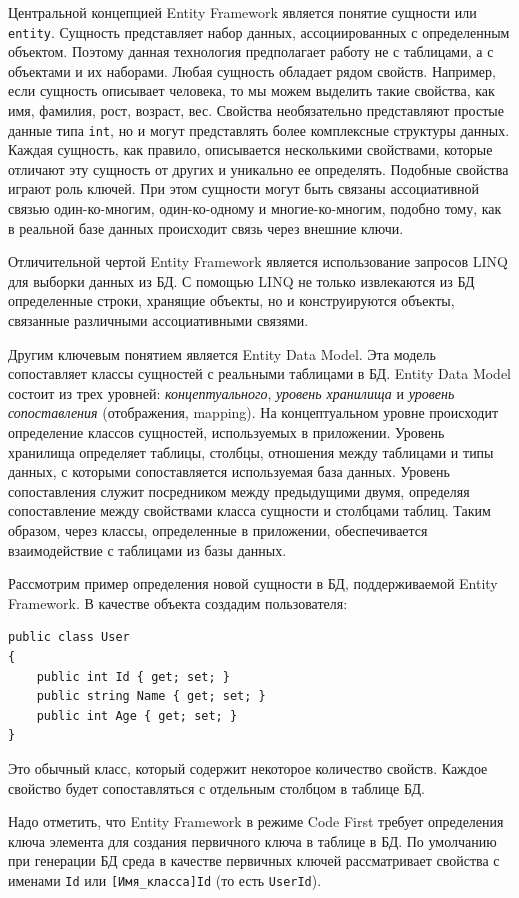 \documentclass[a4paper,14pt,openany,final]{extreport} %
\begin{document}
Центральной концепцией Entity Framework является понятие сущности или \verb|entity|. Сущность представляет набор данных, ассоциированных с определенным объектом. Поэтому данная технология предполагает работу не с таблицами, а с объектами и их наборами. Любая сущность обладает рядом свойств. Например, если сущность описывает человека, то мы можем выделить такие свойства, как имя, фамилия, рост, возраст, вес. Свойства необязательно представляют простые данные типа \verb|int|, но и могут представлять более комплексные структуры данных. Каждая сущность, как правило, описывается несколькими свойствами, которые отличают эту сущность от других и уникально ее определять. Подобные свойства играют роль ключей. При этом сущности могут быть связаны ассоциативной связью один-ко-многим, один-ко-одному и многие-ко-многим, подобно тому, как в реальной базе данных происходит связь через внешние ключи.

Отличительной чертой Entity Framework является использование запросов LINQ для выборки данных из БД. С помощью LINQ не только извлекаются из БД определенные строки, хранящие объекты, но и конструируются объекты, связанные различными ассоциативными связями.

Другим ключевым понятием является Entity Data Model. Эта модель сопоставляет классы сущностей с реальными таблицами в БД.
Entity Data Model состоит из трех уровней: \emph{концептуального},\emph{ уровень хранилища} и\emph{ уровень сопоставления} (отображения, mapping). На концептуальном уровне происходит определение классов сущностей, используемых в приложении. Уровень хранилища определяет таблицы, столбцы, отношения между таблицами и типы данных, с которыми сопоставляется используемая база данных. Уровень сопоставления служит посредником между предыдущими двумя, определяя сопоставление между свойствами класса сущности и столбцами таблиц. Таким образом, через классы, определенные в приложении, обеспечивается взаимодействие с таблицами из базы данных.

Рассмотрим пример определения новой сущности в БД, поддерживаемой Entity Framework. В качестве объекта создадим пользователя:
\begin{verbatim}
public class User
{
    public int Id { get; set; }
    public string Name { get; set; }
    public int Age { get; set; }
}
\end{verbatim}
Это обычный класс, который содержит некоторое количество свойств. Каждое свойство будет сопоставляться с отдельным столбцом в таблице БД.

Надо отметить, что Entity Framework в режиме Code First требует определения ключа элемента для создания первичного ключа в таблице в БД. По умолчанию при генерации БД среда в качестве первичных ключей рассматривает свойства с именами \verb|Id| или \verb|[Имя_класса]Id| (то есть \verb|UserId|).
\end{document}
